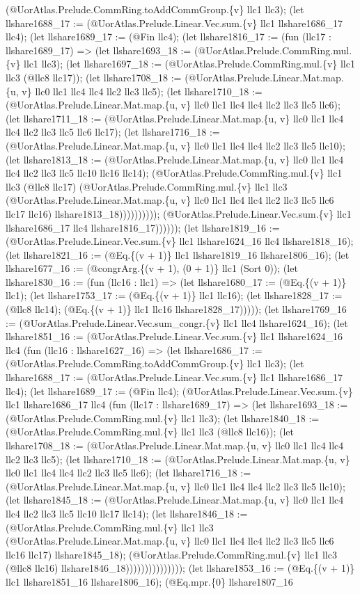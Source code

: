 \documentclass[11pt]{article}
\begin{document}
(@UorAtlas.Prelude.CommRing.toAddCommGroup.\{v\} llc1 llc3); (let llshare1688\_17 := (@UorAtlas.Prelude.Linear.Vec.sum.\{v\} llc1 llshare1686\_17 llc4); (let llshare1689\_17 := (@Fin llc4); (let llshare1816\_17 := (fun (llc17 : llshare1689\_17) => (let llshare1693\_18 := (@UorAtlas.Prelude.CommRing.mul.\{v\} llc1 llc3); (let llshare1697\_18 := (@UorAtlas.Prelude.CommRing.mul.\{v\} llc1 llc3 (@llc8 llc17)); (let llshare1708\_18 := (@UorAtlas.Prelude.Linear.Mat.map.\{u, v\} llc0 llc1 llc4 llc4 llc2 llc3 llc5); (let llshare1710\_18 := (@UorAtlas.Prelude.Linear.Mat.map.\{u, v\} llc0 llc1 llc4 llc4 llc2 llc3 llc5 llc6); (let llshare1711\_18 := (@UorAtlas.Prelude.Linear.Mat.map.\{u, v\} llc0 llc1 llc4 llc4 llc2 llc3 llc5 llc6 llc17); (let llshare1716\_18 := (@UorAtlas.Prelude.Linear.Mat.map.\{u, v\} llc0 llc1 llc4 llc4 llc2 llc3 llc5 llc10); (let llshare1813\_18 := (@UorAtlas.Prelude.Linear.Mat.map.\{u, v\} llc0 llc1 llc4 llc4 llc2 llc3 llc5 llc10 llc16 llc14); (@UorAtlas.Prelude.CommRing.mul.\{v\} llc1 llc3 (@llc8 llc17) (@UorAtlas.Prelude.CommRing.mul.\{v\} llc1 llc3 (@UorAtlas.Prelude.Linear.Mat.map.\{u, v\} llc0 llc1 llc4 llc4 llc2 llc3 llc5 llc6 llc17 llc16) llshare1813\_18)))))))))); (@UorAtlas.Prelude.Linear.Vec.sum.\{v\} llc1 llshare1686\_17 llc4 llshare1816\_17)))))); (let llshare1819\_16 := (@UorAtlas.Prelude.Linear.Vec.sum.\{v\} llc1 llshare1624\_16 llc4 llshare1818\_16); (let llshare1821\_16 := (@Eq.\{(v + 1)\} llc1 llshare1819\_16 llshare1806\_16); (let llshare1677\_16 := (@congrArg.\{(v + 1), (0 + 1)\} llc1 (Sort 0)); (let llshare1830\_16 := (fun (llc16 : llc1) => (let llshare1680\_17 := (@Eq.\{(v + 1)\} llc1); (let llshare1753\_17 := (@Eq.\{(v + 1)\} llc1 llc16); (let llshare1828\_17 := (@llc8 llc14); (@Eq.\{(v + 1)\} llc1 llc16 llshare1828\_17))))); (let llshare1769\_16 := (@UorAtlas.Prelude.Linear.Vec.sum\_congr.\{v\} llc1 llc4 llshare1624\_16); (let llshare1851\_16 := (@UorAtlas.Prelude.Linear.Vec.sum.\{v\} llc1 llshare1624\_16 llc4 (fun (llc16 : llshare1627\_16) => (let llshare1686\_17 := (@UorAtlas.Prelude.CommRing.toAddCommGroup.\{v\} llc1 llc3); (let llshare1688\_17 := (@UorAtlas.Prelude.Linear.Vec.sum.\{v\} llc1 llshare1686\_17 llc4); (let llshare1689\_17 := (@Fin llc4); (@UorAtlas.Prelude.Linear.Vec.sum.\{v\} llc1 llshare1686\_17 llc4 (fun (llc17 : llshare1689\_17) => (let llshare1693\_18 := (@UorAtlas.Prelude.CommRing.mul.\{v\} llc1 llc3); (let llshare1840\_18 := (@UorAtlas.Prelude.CommRing.mul.\{v\} llc1 llc3 (@llc8 llc16)); (let llshare1708\_18 := (@UorAtlas.Prelude.Linear.Mat.map.\{u, v\} llc0 llc1 llc4 llc4 llc2 llc3 llc5); (let llshare1710\_18 := (@UorAtlas.Prelude.Linear.Mat.map.\{u, v\} llc0 llc1 llc4 llc4 llc2 llc3 llc5 llc6); (let llshare1716\_18 := (@UorAtlas.Prelude.Linear.Mat.map.\{u, v\} llc0 llc1 llc4 llc4 llc2 llc3 llc5 llc10); (let llshare1845\_18 := (@UorAtlas.Prelude.Linear.Mat.map.\{u, v\} llc0 llc1 llc4 llc4 llc2 llc3 llc5 llc10 llc17 llc14); (let llshare1846\_18 := (@UorAtlas.Prelude.CommRing.mul.\{v\} llc1 llc3 (@UorAtlas.Prelude.Linear.Mat.map.\{u, v\} llc0 llc1 llc4 llc4 llc2 llc3 llc5 llc6 llc16 llc17) llshare1845\_18); (@UorAtlas.Prelude.CommRing.mul.\{v\} llc1 llc3 (@llc8 llc16) llshare1846\_18))))))))))))))); (let llshare1853\_16 := (@Eq.\{(v + 1)\} llc1 llshare1851\_16 llshare1806\_16); (@Eq.mpr.\{0\} llshare1807\_16 
\end{document}
